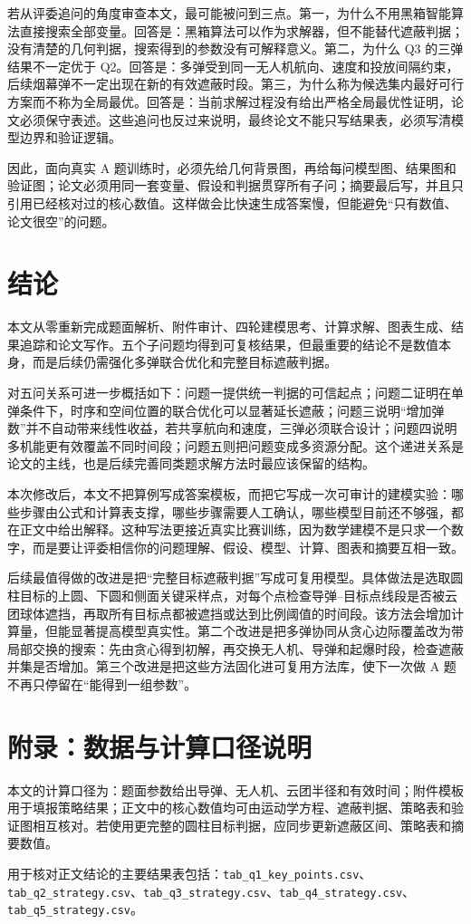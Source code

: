 \documentclass[UTF8,12pt,a4paper]{ctexart}
\begin{document}
若从评委追问的角度审查本文，最可能被问到三点。第一，为什么不用黑箱智能算法直接搜索全部变量。回答是：黑箱算法可以作为求解器，但不能替代遮蔽判据；没有清楚的几何判据，搜索得到的参数没有可解释意义。第二，为什么 Q3 的三弹结果不一定优于 Q2。回答是：多弹受到同一无人机航向、速度和投放间隔约束，后续烟幕弹不一定出现在新的有效遮蔽时段。第三，为什么称为候选集内最好可行方案而不称为全局最优。回答是：当前求解过程没有给出严格全局最优性证明，论文必须保守表述。这些追问也反过来说明，最终论文不能只写结果表，必须写清模型边界和验证逻辑。

因此，面向真实 A 题训练时，必须先给几何背景图，再给每问模型图、结果图和验证图；论文必须用同一套变量、假设和判据贯穿所有子问；摘要最后写，并且只引用已经核对过的核心数值。这样做会比快速生成答案慢，但能避免“只有数值、论文很空”的问题。

\section{结论}

本文从零重新完成题面解析、附件审计、四轮建模思考、计算求解、图表生成、结果追踪和论文写作。五个子问题均得到可复核结果，但最重要的结论不是数值本身，而是后续仍需强化多弹联合优化和完整目标遮蔽判据。

对五问关系可进一步概括如下：问题一提供统一判据的可信起点；问题二证明在单弹条件下，时序和空间位置的联合优化可以显著延长遮蔽；问题三说明“增加弹数”并不自动带来线性收益，若共享航向和速度，三弹必须联合设计；问题四说明多机能更有效覆盖不同时间段；问题五则把问题变成多资源分配。这个递进关系是论文的主线，也是后续完善同类题求解方法时最应该保留的结构。

本次修改后，本文不把算例写成答案模板，而把它写成一次可审计的建模实验：哪些步骤由公式和计算表支撑，哪些步骤需要人工确认，哪些模型目前还不够强，都在正文中给出解释。这种写法更接近真实比赛训练，因为数学建模不是只求一个数字，而是要让评委相信你的问题理解、假设、模型、计算、图表和摘要互相一致。

后续最值得做的改进是把“完整目标遮蔽判据”写成可复用模型。具体做法是选取圆柱目标的上圆、下圆和侧面关键采样点，对每个点检查导弹--目标点线段是否被云团球体遮挡，再取所有目标点都被遮挡或达到比例阈值的时间段。该方法会增加计算量，但能显著提高模型真实性。第二个改进是把多弹协同从贪心边际覆盖改为带局部交换的搜索：先由贪心得到初解，再交换无人机、导弹和起爆时段，检查遮蔽并集是否增加。第三个改进是把这些方法固化进可复用方法库，使下一次做 A 题不再只停留在“能得到一组参数”。

\appendix
\section{附录：数据与计算口径说明}

本文的计算口径为：题面参数给出导弹、无人机、云团半径和有效时间；附件模板用于填报策略结果；正文中的核心数值均可由运动学方程、遮蔽判据、策略表和验证图相互核对。若使用更完整的圆柱目标判据，应同步更新遮蔽区间、策略表和摘要数值。

用于核对正文结论的主要结果表包括：\verb|tab_q1_key_points.csv|、\verb|tab_q2_strategy.csv|、\verb|tab_q3_strategy.csv|、\verb|tab_q4_strategy.csv|、\verb|tab_q5_strategy.csv|。
\end{document}
